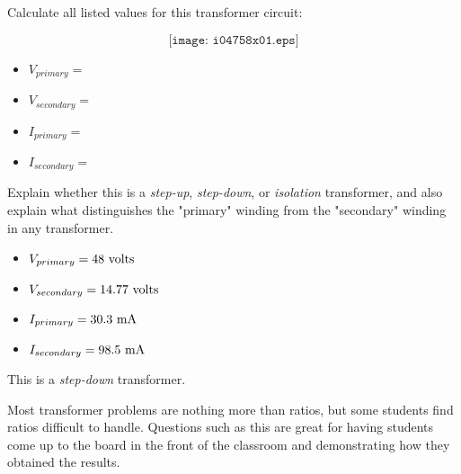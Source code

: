 

Calculate all listed values for this transformer circuit:

$$\texttt{[image: i04758x01.eps]}$$

\begin{itemize}
\item{} $V_{primary} = $
\item{} $V_{secondary} = $
\item{} $I_{primary} = $
\item{} $I_{secondary} = $
\end{itemize}

Explain whether this is a {\it step-up}, {\it step-down}, or {\it isolation} transformer, and also explain what distinguishes the "primary" winding from the "secondary" winding in any transformer.







\begin{itemize}
\item{} $V_{primary} = 48 \hbox{ volts}$
\item{} $V_{secondary} = 14.77 \hbox{ volts}$
\item{} $I_{primary} = 30.3 \hbox{ mA}$
\item{} $I_{secondary} = 98.5 \hbox{ mA}$
\end{itemize}

This is a {\it step-down} transformer.







Most transformer problems are nothing more than ratios, but some students find ratios difficult to handle.  Questions such as this are great for having students come up to the board in the front of the classroom and demonstrating how they obtained the results.




